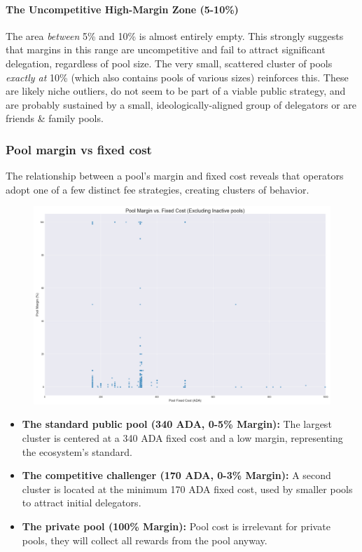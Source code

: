 \documentclass[11pt, letterpaper]{article}
\begin{document}
\paragraph{The Uncompetitive High-Margin Zone (5-10\%)}
The area \textit{between} 5\% and 10\% is almost entirely empty. This
strongly suggests that margins in this range are uncompetitive and
fail to attract significant delegation, regardless of pool size. The
very small, scattered cluster of pools \textit{exactly at} 10\%
(which also contains pools of various sizes) reinforces this. These are
likely niche outliers, do not seem to be part of a viable public strategy, and are
probably sustained by a small, ideologically-aligned group of delegators or are
friends \& family pools.

\subsubsection{Pool margin vs fixed cost}
The relationship between a pool's margin and fixed cost reveals that operators
adopt one of a few distinct fee strategies, creating clusters of behavior.

\begin{figure}[H]
	\centering
	\includegraphics[width=\textwidth]{img/pool_cost_vs_margin.png}
\end{figure}

\begin{itemize}
	\item \textbf{The standard public pool (340 ADA, 0-5\% Margin):} The largest cluster is centered at a
	      340 ADA fixed cost and a low margin, representing the ecosystem's standard.
	\item \textbf{The competitive challenger (170 ADA, 0-3\% Margin):} A second cluster is located at the
	      minimum 170 ADA fixed cost, used by smaller pools to attract initial delegators.
	\item \textbf{The private pool (100\% Margin):} Pool cost is irrelevant for private pools, they will
	      collect all rewards from the pool anyway.
\end{itemize}
\end{document}
